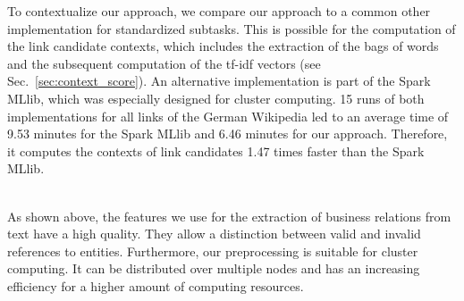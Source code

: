 To contextualize our approach, we compare our approach to a common other implementation for standardized subtasks. This is possible for the computation of the link candidate contexts, which includes the extraction of the bags of words and the subsequent computation of the tf-idf vectors (see Sec.~\ref{sec:context_score}). An alternative implementation is part of the Spark MLlib\footnotemark{}, which was especially designed for cluster computing. 15 runs of both implementations for all links of the German Wikipedia led to an average time of 9.53 minutes for the Spark MLlib and 6.46 minutes for our approach. Therefore, it computes the contexts of link candidates 1.47 times faster than the Spark MLlib.

~\\

As shown above, the features we use for the extraction of business relations from text have a high quality. They allow a distinction between valid and invalid references to entities. Furthermore, our preprocessing is suitable for cluster computing. It can be distributed over multiple nodes and has an increasing efficiency for a higher amount of computing resources.